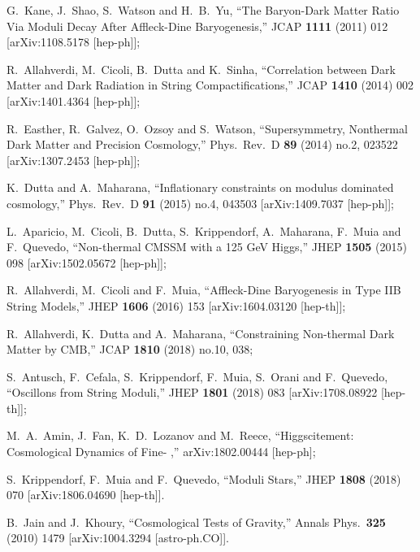 \documentclass[11pt,a4paper]{article}
\begin{document}
\begin{thebibliography}{99}
G.~Kane, J.~Shao, S.~Watson and H.~B.~Yu,
  ``The Baryon-Dark Matter Ratio Via Moduli Decay After Affleck-Dine Baryogenesis,''
  JCAP {\bf 1111} (2011) 012
  [arXiv:1108.5178 [hep-ph]];
  
R.~Allahverdi, M.~Cicoli, B.~Dutta and K.~Sinha,
  ``Correlation between Dark Matter and Dark Radiation in String Compactifications,''
  JCAP {\bf 1410} (2014) 002
  [arXiv:1401.4364 [hep-ph]];  
  
  R.~Easther, R.~Galvez, O.~Ozsoy and S.~Watson,
  ``Supersymmetry, Nonthermal Dark Matter and Precision Cosmology,''
  Phys.\ Rev.\ D {\bf 89} (2014) no.2,  023522
  [arXiv:1307.2453 [hep-ph]];
  
 K.~Dutta and A.~Maharana,
  ``Inflationary constraints on modulus dominated cosmology,''
  Phys.\ Rev.\ D {\bf 91} (2015) no.4,  043503
  [arXiv:1409.7037 [hep-ph]];  
  
  L.~Aparicio, M.~Cicoli, B.~Dutta, S.~Krippendorf, A.~Maharana, F.~Muia and F.~Quevedo,
  ``Non-thermal CMSSM with a 125 GeV Higgs,''
  JHEP {\bf 1505} (2015) 098
  [arXiv:1502.05672 [hep-ph]];  
  
R.~Allahverdi, M.~Cicoli and F.~Muia,
  ``Affleck-Dine Baryogenesis in Type IIB String Models,''
  JHEP {\bf 1606} (2016) 153
  [arXiv:1604.03120 [hep-th]];
  
  R.~Allahverdi, K.~Dutta and A.~Maharana,
  ``Constraining Non-thermal Dark Matter by CMB,''
  JCAP {\bf 1810} (2018) no.10,  038;
  
  S.~Antusch, F.~Cefala, S.~Krippendorf, F.~Muia, S.~Orani and F.~Quevedo,
  ``Oscillons from String Moduli,''
  JHEP {\bf 1801} (2018) 083
  [arXiv:1708.08922 [hep-th]];
  
  M.~A.~Amin, J.~Fan, K.~D.~Lozanov and M.~Reece,
  ``Higgscitement: Cosmological Dynamics of Fine-	,''
  arXiv:1802.00444 [hep-ph];
    
   S.~Krippendorf, F.~Muia and F.~Quevedo,
  ``Moduli Stars,''
  JHEP {\bf 1808} (2018) 070
  [arXiv:1806.04690 [hep-th]].
  
  
  B.~Jain and J.~Khoury,
  ``Cosmological Tests of Gravity,''
  Annals Phys.\  {\bf 325} (2010) 1479
  [arXiv:1004.3294 [astro-ph.CO]].



\end{thebibliography}
\end{document}
